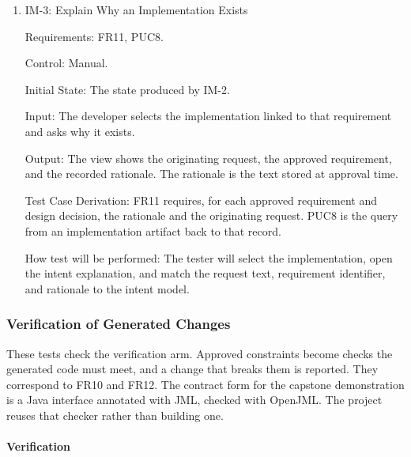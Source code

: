 \documentclass[12pt, titlepage]{article}
\begin{document}
\begin{enumerate}
\item{IM-3: Explain Why an Implementation Exists\\}

Requirements: FR11, PUC8.

Control: Manual.

Initial State: The state produced by IM-2.

Input: The developer selects the implementation linked to that requirement
and asks why it exists.

Output: The view shows the originating request, the approved requirement,
and the recorded rationale. The rationale is the text stored at approval
time.

Test Case Derivation: FR11 requires, for each approved requirement and
design decision, the rationale and the originating request. PUC8 is the
query from an implementation artifact back to that record.

How test will be performed: The tester will select the implementation, open
the intent explanation, and match the request text, requirement identifier,
and rationale to the intent model.

\end{enumerate}

\subsubsection{Verification of Generated Changes}

These tests check the verification arm. Approved constraints become checks
the generated code must meet, and a change that breaks them is reported.
They correspond to FR10 and FR12. The contract form for the capstone
demonstration is a Java interface annotated with JML, checked with OpenJML.
The project reuses that checker rather than building one.

\paragraph{Verification}
\end{document}
